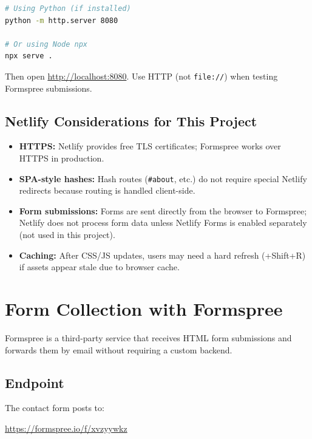 \documentclass[11pt,a4paper]{article}
\begin{document}
\begin{lstlisting}[language=bash]
# Using Python (if installed)
python -m http.server 8080

# Or using Node npx
npx serve .
\end{lstlisting}

Then open \url{http://localhost:8080}. Use HTTP (not \texttt{file://}) when
testing Formspree submissions.

\subsection{Netlify Considerations for This Project}

\begin{itemize}
  \item \textbf{HTTPS:} Netlify provides free TLS certificates; Formspree works
        over HTTPS in production.
  \item \textbf{SPA-style hashes:} Hash routes (\texttt{\#about}, etc.) do not
        require special Netlify redirects because routing is handled client-side.
  \item \textbf{Form submissions:} Forms are sent directly from the browser to
        Formspree; Netlify does not process form data unless Netlify Forms is
        enabled separately (not used in this project).
  \item \textbf{Caching:} After CSS/JS updates, users may need a hard refresh
        (\Ctrl+Shift+R) if assets appear stale due to browser cache.
\end{itemize}

\section{Form Collection with Formspree}
\label{sec:formspree}

Formspree is a third-party service that receives HTML form submissions and
forwards them by email without requiring a custom backend.

\subsection{Endpoint}

The contact form posts to:

\begin{center}
\url{https://formspree.io/f/xvzyywkz}
\end{center}
\end{document}

